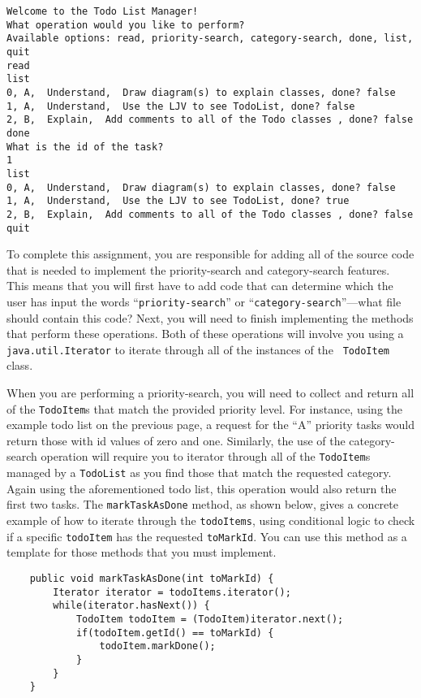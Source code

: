 \vspace{-0.05in}
\begin{verbatim}
Welcome to the Todo List Manager!
What operation would you like to perform?
Available options: read, priority-search, category-search, done, list, quit
read
list
0, A,  Understand,  Draw diagram(s) to explain classes, done? false
1, A,  Understand,  Use the LJV to see TodoList, done? false
2, B,  Explain,  Add comments to all of the Todo classes , done? false
done
What is the id of the task?
1
list
0, A,  Understand,  Draw diagram(s) to explain classes, done? false
1, A,  Understand,  Use the LJV to see TodoList, done? true
2, B,  Explain,  Add comments to all of the Todo classes , done? false
quit
\end{verbatim}
\vspace{-0.05in}

To complete this assignment, you are responsible for adding all of the source code that is needed to implement the
priority-search and category-search features. This means that you will first have to add code that can determine which
the user has input the words ``{\tt priority-search}'' or ``{\tt category-search}''---what file should contain this
code?  Next, you will need to finish implementing the methods that perform these operations.  Both of these
operations will involve you using a {\tt java.util.Iterator} to iterate through all of the instances of the {\tt
  TodoItem} class. 

When you are performing a priority-search, you will need to collect and return all of the {\tt TodoItem}s that match the
provided priority level.  For instance, using the example todo list on the previous page, a request for the ``A''
priority tasks would return those with id values of zero and one. Similarly, the use of the category-search operation
will require you to iterator through all of the {\tt TodoItem}s managed by a {\tt TodoList} as you find those that match
the requested category. Again using the aforementioned todo list, this operation would also return the first two tasks.
The {\tt markTaskAsDone} method, as shown below, gives a concrete example of how to iterate through the {\tt todoItems},
using conditional logic to check if a specific {\tt todoItem} has the requested {\tt toMarkId}. You can use this method
as a template for those methods that you must implement.

\begin{verbatim}
    public void markTaskAsDone(int toMarkId) {
        Iterator iterator = todoItems.iterator();
        while(iterator.hasNext()) {
            TodoItem todoItem = (TodoItem)iterator.next();
            if(todoItem.getId() == toMarkId) {
                todoItem.markDone();
            }
        }
    }
\end{verbatim}

